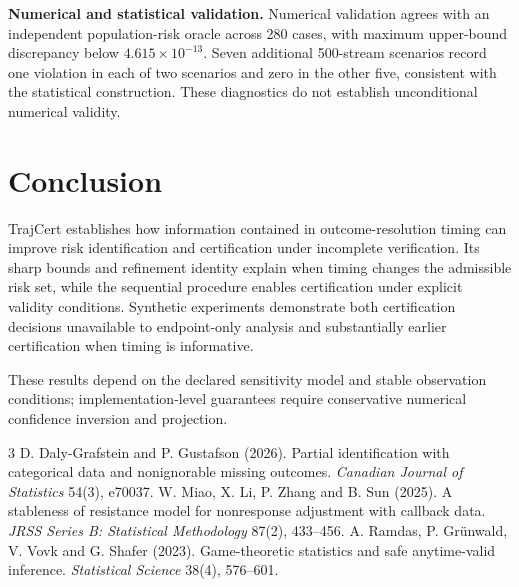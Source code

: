 \documentclass[a4paper,11pt]{article}
\begin{document}
\textbf{Numerical and statistical validation.}
Numerical validation agrees with an independent population-risk oracle across 280 cases, with maximum upper-bound discrepancy below $4.615\times10^{-13}$. Seven additional 500-stream scenarios record one violation in each of two scenarios and zero in the other five, consistent with the statistical construction. These diagnostics do not establish unconditional numerical validity.

\section{Conclusion}
TrajCert establishes how information contained in outcome-resolution timing can improve risk identification and certification under incomplete verification. Its sharp bounds and refinement identity explain when timing changes the admissible risk set, while the sequential procedure enables certification under explicit validity conditions. Synthetic experiments demonstrate both certification decisions unavailable to endpoint-only analysis and substantially earlier certification when timing is informative.

These results depend on the declared sensitivity model and stable observation conditions; implementation-level guarantees require conservative numerical confidence inversion and projection.

\vspace{-3pt}
\renewcommand{\refname}{References}
\begin{thebibliography}{3}
\fontsize{9.5}{10.5}\selectfont\setlength{\itemsep}{1pt}\setlength{\parskip}{0pt}
 D. Daly-Grafstein and P. Gustafson (2026). Partial identification with categorical data and nonignorable missing outcomes. \emph{Canadian Journal of Statistics} 54(3), e70037.
 W. Miao, X. Li, P. Zhang and B. Sun (2025). A stableness of resistance model for nonresponse adjustment with callback data. \emph{JRSS Series B: Statistical Methodology} 87(2), 433--456.
 A. Ramdas, P. Gr\"unwald, V. Vovk and G. Shafer (2023). Game-theoretic statistics and safe anytime-valid inference. \emph{Statistical Science} 38(4), 576--601.
\end{thebibliography}
\end{document}
